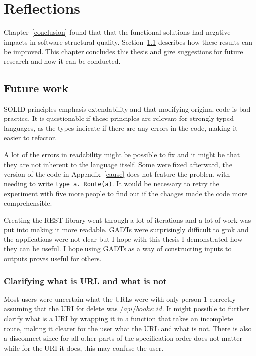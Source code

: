 \chapter{Reflections}\label{reflection}

Chapter~\ref{conclusion} found that that the functional solutions had
negative impacts in software structural quality.  Section~\ref{futurework}
describes how these results can be improved. This chapter concludes this thesis
and give suggestions for future research and how it can be conducted.

\section{Future work}\label{futurework}

SOLID principles emphasis extendability and that modifying original code is bad
practice. It is questionable if these principles are relevant for strongly typed
languages, as the types indicate if there are any errors in the code, making it
easier to refactor.

A lot of the errors in readability might be possible to fix and it might be that
they are not inherent to the language itself. Some were fixed afterward, the
version of the code in Appendix~\ref{cause} does not feature the problem with
needing to write \texttt{type a. Route(a)}. It would be necessary to retry the
experiment with five more people to find out if the changes made the code more
comprehensible. 

Creating the REST library went through a lot of iterations and a lot of work was
put into making it more readable. GADTs were surprisingly difficult to grok and
the applications were not clear but I hope with this thesis I demonstrated how
they can be useful. I hope using GADTs as a way of constructing inputs to
outputs proves useful for others.

\subsection{Clarifying what is URL and what is not}

Most users were uncertain what the URLs were with only person 1 correctly
assuming that the URI for delete was $/api/books:id$. It might possible to
further clarify what is a URI by wrapping it in a function that takes an
incomplete route, making it clearer for the user what the URL and what is not.
There is also a disconnect since for all other parts of the specification order
does not matter while for the URI it does, this may confuse the user.

